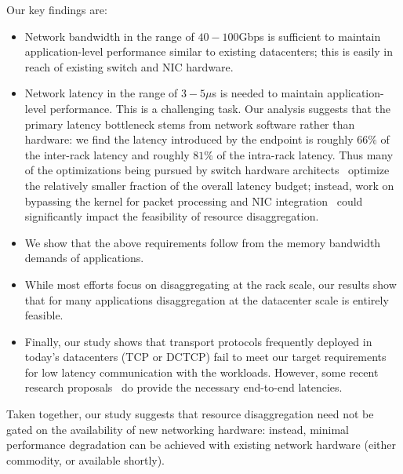 \noindent Our key findings are:
\vspace{-0.5em}
\begin{itemize}[leftmargin=*]
\itemsep0em
	\item Network bandwidth in the range of $40-100$Gbps  is sufficient to maintain application-level performance similar to existing datacenters; this is easily in reach of existing switch and NIC hardware. 
	\item Network latency in the range of $3-5\mu$s is needed to maintain application-level performance. This is a challenging task. Our analysis suggests that the primary latency bottleneck stems from  network software rather than hardware: we find the latency introduced by the endpoint is roughly $66\%$ of the inter-rack latency and roughly $81\%$ of the intra-rack latency. Thus many of the optimizations being pursued by switch hardware architects~\cite{mellanox} optimize the relatively smaller fraction of the overall latency budget; instead, work on bypassing the kernel for packet processing and NIC integration~\cite{cpu-nic} could significantly impact the feasibility of resource disaggregation.
	\item We show that the above requirements follow from the memory bandwidth demands of applications.
	\item While most efforts focus on disaggregating at the rack scale, our results show that for many applications disaggregation at the datacenter scale is entirely feasible.	%
 	\item Finally, our study shows that transport protocols frequently deployed in today's datacenters (TCP or DCTCP) fail to meet our target requirements for low latency communication with the \dis workloads. However, some recent research proposals~\cite{pfabric, phost} do provide the necessary end-to-end latencies. 
\end{itemize} 

\noindent
Taken together, our study suggests that resource disaggregation need not be gated on the availability of new networking hardware: instead, minimal performance degradation can be achieved with existing network hardware (either commodity, or available shortly).

